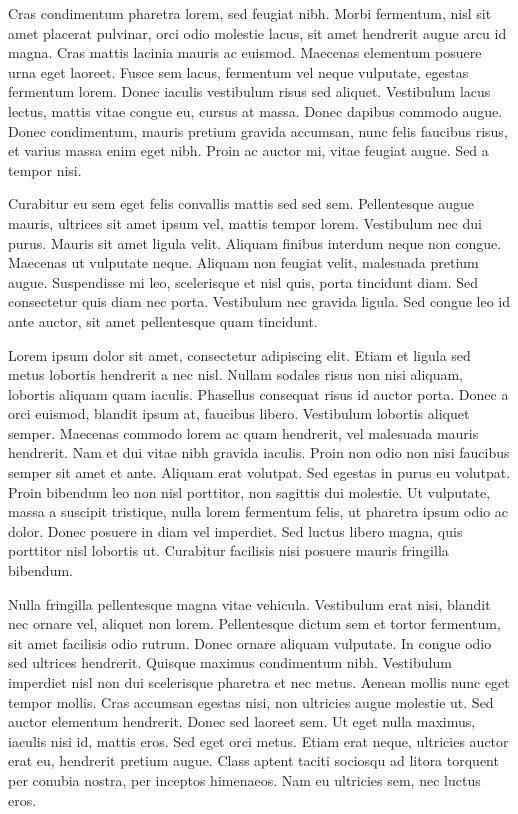 \documentclass[11pt,twoside]{article}
\begin{document}
Cras condimentum pharetra lorem, sed feugiat nibh. Morbi fermentum, nisl sit amet placerat pulvinar, orci odio molestie lacus, sit amet hendrerit augue arcu id magna. Cras mattis lacinia mauris ac euismod. Maecenas elementum posuere urna eget laoreet. Fusce sem lacus, fermentum vel neque vulputate, egestas fermentum lorem. Donec iaculis vestibulum risus sed aliquet. Vestibulum lacus lectus, mattis vitae congue eu, cursus at massa. Donec dapibus commodo augue. Donec condimentum, mauris pretium gravida accumsan, nunc felis faucibus risus, et varius massa enim eget nibh. Proin ac auctor mi, vitae feugiat augue. Sed a tempor nisi.

Curabitur eu sem eget felis convallis mattis sed sed sem. Pellentesque augue mauris, ultrices sit amet ipsum vel, mattis tempor lorem. Vestibulum nec dui purus. Mauris sit amet ligula velit. Aliquam finibus interdum neque non congue. Maecenas ut vulputate neque. Aliquam non feugiat velit, malesuada pretium augue. Suspendisse mi leo, scelerisque et nisl quis, porta tincidunt diam. Sed consectetur quis diam nec porta. Vestibulum nec gravida ligula. Sed congue leo id ante auctor, sit amet pellentesque quam tincidunt. 





Lorem ipsum dolor sit amet, consectetur adipiscing elit. Etiam et ligula sed metus lobortis hendrerit a nec nisl. Nullam sodales risus non nisi aliquam, lobortis aliquam quam iaculis. Phasellus consequat risus id auctor porta. Donec a orci euismod, blandit ipsum at, faucibus libero. Vestibulum lobortis aliquet semper. Maecenas commodo lorem ac quam hendrerit, vel malesuada mauris hendrerit. Nam et dui vitae nibh gravida iaculis. Proin non odio non nisi faucibus semper sit amet et ante. Aliquam erat volutpat. Sed egestas in purus eu volutpat. Proin bibendum leo non nisl porttitor, non sagittis dui molestie. Ut vulputate, massa a suscipit tristique, nulla lorem fermentum felis, ut pharetra ipsum odio ac dolor. Donec posuere in diam vel imperdiet. Sed luctus libero magna, quis porttitor nisl lobortis ut. Curabitur facilisis nisi posuere mauris fringilla bibendum.

Nulla fringilla pellentesque magna vitae vehicula. Vestibulum erat nisi, blandit nec ornare vel, aliquet non lorem. Pellentesque dictum sem et tortor fermentum, sit amet facilisis odio rutrum. Donec ornare aliquam vulputate. In congue odio sed ultrices hendrerit. Quisque maximus condimentum nibh. Vestibulum imperdiet nisl non dui scelerisque pharetra et nec metus. Aenean mollis nunc eget tempor mollis. Cras accumsan egestas nisi, non ultricies augue molestie ut. Sed auctor elementum hendrerit. Donec sed laoreet sem. Ut eget nulla maximus, iaculis nisi id, mattis eros. Sed eget orci metus. Etiam erat neque, ultricies auctor erat eu, hendrerit pretium augue. Class aptent taciti sociosqu ad litora torquent per conubia nostra, per inceptos himenaeos. Nam eu ultricies sem, nec luctus eros.
\end{document}
